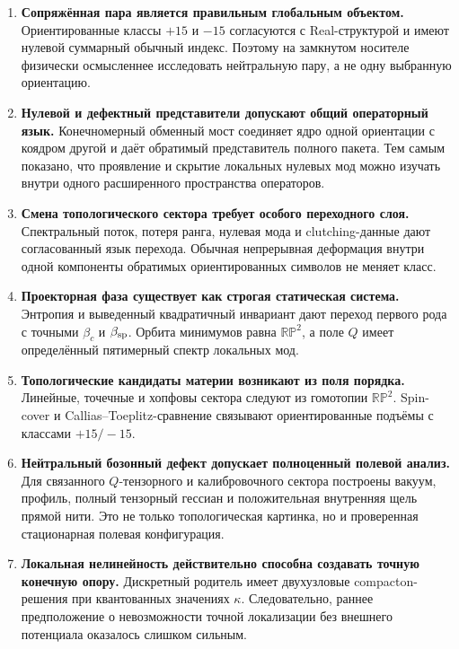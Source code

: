 \begin{enumerate}
 \item \textbf{Сопряжённая пара является правильным глобальным объектом.}
 Ориентированные классы $+15$ и $-15$ согласуются с Real-структурой и
 имеют нулевой суммарный обычный индекс. Поэтому на замкнутом носителе
 физически осмысленнее исследовать нейтральную пару, а не одну выбранную
 ориентацию.

 \item \textbf{Нулевой и дефектный представители допускают общий
 операторный язык.} Конечномерный обменный мост соединяет ядро одной
 ориентации с коядром другой и даёт обратимый представитель полного
 пакета. Тем самым показано, что проявление и скрытие локальных нулевых
 мод можно изучать внутри одного расширенного пространства операторов.

 \item \textbf{Смена топологического сектора требует особого переходного
 слоя.} Спектральный поток, потеря ранга, нулевая мода и clutching-данные
 дают согласованный язык перехода. Обычная непрерывная деформация внутри
 одной компоненты обратимых ориентированных символов не меняет класс.

 \item \textbf{Проекторная фаза существует как строгая статическая
 система.} Энтропия и выведенный квадратичный инвариант дают переход
 первого рода с точными $\beta_c$ и $\beta_{\rm sp}$. Орбита минимумов
 равна $\mathbb{RP}^2$, а поле $Q$ имеет определённый пятимерный спектр
 локальных мод.

 \item \textbf{Топологические кандидаты материи возникают из поля
 порядка.} Линейные, точечные и хопфовы сектора следуют из гомотопии
 $\mathbb{RP}^2$. Spin-cover и Callias--Toeplitz-сравнение связывают
 ориентированные подъёмы с классами $+15/-15$.

 \item \textbf{Нейтральный бозонный дефект допускает полноценный
 полевой анализ.} Для связанного $Q$-тензорного и калибровочного сектора
 построены вакуум, профиль, полный тензорный гессиан и положительная
 внутренняя щель прямой нити. Это не только топологическая картинка, но и
 проверенная стационарная полевая конфигурация.

 \item \textbf{Локальная нелинейность действительно способна создавать
 точную конечную опору.} Дискретный родитель имеет двухузловые
 compacton-решения при квантованных значениях $\kappa$. Следовательно,
 раннее предположение о невозможности точной локализации без внешнего
 потенциала оказалось слишком сильным.


\end{enumerate}
